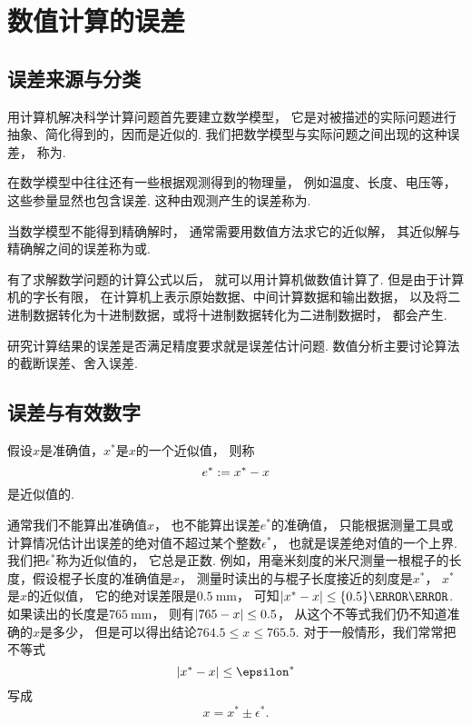 \section{数值计算的误差}
\subsection{误差来源与分类}
用计算机解决科学计算问题首先要建立数学模型，
它是对被描述的实际问题进行抽象、简化得到的，因而是近似的.
我们把数学模型与实际问题之间出现的这种误差，
称为.

在数学模型中往往还有一些根据观测得到的物理量，
例如温度、长度、电压等，
这些参量显然也包含误差.
这种由观测产生的误差称为.

当数学模型不能得到精确解时，
通常需要用数值方法求它的近似解，
其近似解与精确解之间的误差称为或.

有了求解数学问题的计算公式以后，
就可以用计算机做数值计算了.
但是由于计算机的字长有限，
在计算机上表示原始数据、中间计算数据和输出数据，
以及将二进制数据转化为十进制数据，或将十进制数据转化为二进制数据时，
都会产生.

研究计算结果的误差是否满足精度要求就是误差估计问题.
数值分析主要讨论算法的截断误差、舍入误差.

\subsection{误差与有效数字}
假设\(x\)是准确值，\(x^*\)是\(x\)的一个近似值，
则称\begin{equation}
	e^* := x^* - x
\end{equation}
是近似值的.

通常我们不能算出准确值\(x\)，
也不能算出误差\(e^*\)的准确值，
只能根据测量工具或计算情况估计出误差的绝对值不超过某个整数\(\epsilon^*\)，
也就是误差绝对值的一个上界.
我们把\(\epsilon^*\)称为近似值的，
它总是正数.
例如，用毫米刻度的米尺测量一根棍子的长度，假设棍子长度的准确值是\(x\)，
测量时读出的与棍子长度接近的刻度是\(x^*\)，
\(x^*\)是\(x\)的近似值，
它的绝对误差限是\(\qty{0.5}{\milli\meter}\)，
可知\(\abs{x^* - x} \leq \qty{0.5}{\milli\meter}\).
如果读出的长度是\(\qty{765}{\milli\meter}\)，
则有\(\abs{765-x} \leq 0.5\)，
从这个不等式我们仍不知道准确的\(x\)是多少，
但是可以得出结论\(764.5 \leq x \leq 765.5\).
对于一般情形，我们常常把不等式\begin{equation}
	\abs{x^* - x} \leq \epsilon^*
\end{equation}
写成\begin{equation}
	x = x^* \pm \epsilon^*.
\end{equation}

